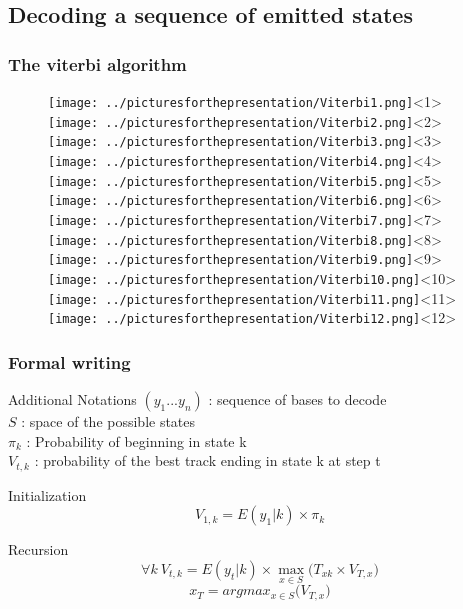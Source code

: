 \documentclass{beamer}
\begin{document}
\subsection{Decoding a sequence of emitted states}

\begin{frame}
\frametitle{The viterbi algorithm}

		\begin{figure}[h]
			\centering
			\texttt{[image: ../picturesforthepresentation/Viterbi1.png]}<1>
			\texttt{[image: ../picturesforthepresentation/Viterbi2.png]}<2>
			\texttt{[image: ../picturesforthepresentation/Viterbi3.png]}<3>
			\texttt{[image: ../picturesforthepresentation/Viterbi4.png]}<4>
			\texttt{[image: ../picturesforthepresentation/Viterbi5.png]}<5>
			\texttt{[image: ../picturesforthepresentation/Viterbi6.png]}<6>
			\texttt{[image: ../picturesforthepresentation/Viterbi7.png]}<7>
			\texttt{[image: ../picturesforthepresentation/Viterbi8.png]}<8>
			\texttt{[image: ../picturesforthepresentation/Viterbi9.png]}<9>
			\texttt{[image: ../picturesforthepresentation/Viterbi10.png]}<10>
			\texttt{[image: ../picturesforthepresentation/Viterbi11.png]}<11>
			\texttt{[image: ../picturesforthepresentation/Viterbi12.png]}<12>			
		\end{figure}

\end{frame}


\begin{frame}
\frametitle{Formal writing}

\begin{block}{Additional Notations}
$(y_1...y_n)$ : sequence of bases to decode\\
$S$ : space of the possible states\\
$\pi_{k}$ : Probability of beginning in state k\\
$V_{t,k}$ : probability of the best track ending in state k at step t
\end{block}

\begin{block}{Initialization}
\begin{equation*}
V_{1,k} = E(y_1|k)\times\pi_{k}
\end{equation*}
\end{block}

\begin{block}{Recursion}
\begin{equation*}
\forall k\ V_{t,k} = E(y_t|k)\times\max_{x \in S}\big(T_{xk}\times V_{T,x}\big)
\end{equation*}
\begin{equation*}
x_{T} = argmax_{x \in S}\big(V_{T,x}\big)
\end{equation*}
\end{block}

\end{frame}
\end{document}
